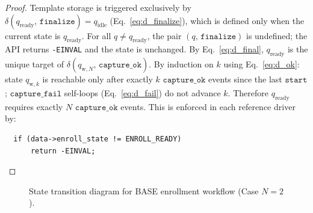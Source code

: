 \begin{proof}
Template storage is triggered exclusively by \\ $\delta(q_{\mathrm{ready}},\,\mathtt{finalize}) = q_{\mathrm{idle}}$ (Eq.~\eqref{eq:d_finalize}), which is defined only when the current state is $q_{\mathrm{ready}}$. For all $q \neq q_{\mathrm{ready}}$, the pair $(q,\, \mathtt{finalize})$ is undefined; the API returns \texttt{-EINVAL} and the state is unchanged. By Eq.~\eqref{eq:d_final}, $q_{\mathrm{ready}}$ is the unique target of $\delta(q_{\mathrm{w},N},\,\mathtt{capture\_ok})$. By induction on $k$ using Eq.~\eqref{eq:d_ok}: state $q_{\mathrm{w},k}$ is reachable only after exactly $k$ $\mathtt{capture\_ok}$ events since the last $\mathtt{start}$; $\mathtt{capture\_fail}$ self-loops (Eq.~\eqref{eq:d_fail}) do not advance $k$. Therefore $q_{\mathrm{ready}}$ requires exactly $N$ $\mathtt{capture\_ok}$ events. This is enforced in each reference driver by:
\begin{verbatim}
  if (data->enroll_state != ENROLL_READY)
      return -EINVAL;
\end{verbatim}
\end{proof}

\begin{figure}
    \centering
    \caption{State transition diagram for BASE enrollment workflow (Case $N=2$).}
    \label{fig:fsm}
\end{figure}

